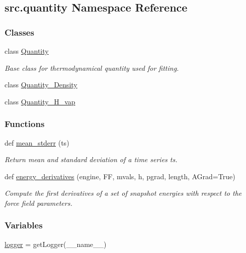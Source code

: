 \hypertarget{namespacesrc_1_1quantity}{}\subsection{src.\+quantity Namespace Reference}
\label{namespacesrc_1_1quantity}
\subsubsection*{Classes}
\begin{DoxyCompactItemize}
\item 
class \hyperlink{classsrc_1_1quantity_1_1Quantity}{Quantity}
\begin{DoxyCompactList}\small\item\em Base class for thermodynamical quantity used for fitting. \end{DoxyCompactList}\item 
class \hyperlink{classsrc_1_1quantity_1_1Quantity__Density}{Quantity\+\_\+\+Density}
\item 
class \hyperlink{classsrc_1_1quantity_1_1Quantity__H__vap}{Quantity\+\_\+\+H\+\_\+vap}
\end{DoxyCompactItemize}
\subsubsection*{Functions}
\begin{DoxyCompactItemize}
\item 
def \hyperlink{namespacesrc_1_1quantity_abf34041e04e73124655bf67566e8346b}{mean\+\_\+stderr} (ts)
\begin{DoxyCompactList}\small\item\em Return mean and standard deviation of a time series ts. \end{DoxyCompactList}\item 
def \hyperlink{namespacesrc_1_1quantity_ad54b891da90cd132afe1a57dfde0f03f}{energy\+\_\+derivatives} (engine, FF, mvals, h, pgrad, length, A\+Grad=True)
\begin{DoxyCompactList}\small\item\em Compute the first derivatives of a set of snapshot energies with respect to the force field parameters. \end{DoxyCompactList}\end{DoxyCompactItemize}
\subsubsection*{Variables}
\begin{DoxyCompactItemize}
\item 
\hyperlink{namespacesrc_1_1quantity_acff8db4e0f2c2b0748a9286ac7a8ee52}{logger} = get\+Logger(\+\_\+\+\_\+name\+\_\+\+\_\+)
\end{DoxyCompactItemize}


